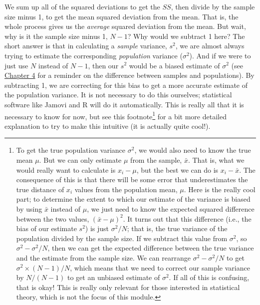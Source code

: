 \documentclass[
]{scrbook}
\begin{document}
We sum up all of the squared deviations to get the \(SS\), then divide by the sample size minus 1, to get the mean squared deviation from the mean.
That is, the whole process gives us the \emph{average} squared deviation from the mean.
But wait, why is it the sample size minus 1, \(N - 1\)?
Why would we subtract 1 here?
The short answer is that in calculating a \emph{sample} variance, \(s^{2}\), we are almost always trying to estimate the corresponding \emph{population} variance (\(\sigma^{2}\)).
And if we were to just use \(N\) instead of \(N - 1\), then our \(s^{2}\) would be a biased estimate of \(\sigma^{2}\) (see \protect\hyperlink{Chapter_4}{Chapter 4} for a reminder on the difference between samples and populations).
By subtracting 1, we are correcting for this bias to get a more accurate estimate of the population variance.
It is not necessary to do this ourselves; statistical software like Jamovi and R will do it automatically.
This is really all that it is necessary to know for now, but see this footnote\footnote{To get the true population variance \(\sigma^{2}\), we would also need to know the true mean \(\mu\). But we can only estimate \(\mu\) from the sample, \(\bar{x}\). That is, what we would really want to calculate is \(x_{i} - \mu\), but the best we can do is \(x_{i} - \bar{x}\). The consequence of this is that there will be some error that underestimates the true distance of \(x_{i}\) values from the population mean, \(\mu\). Here is the really cool part; to determine the extent to which our estimate of the variance is biased by using \(\bar{x}\) instead of \(\mu\), we just need to know the expected squared difference between the two values, \((\bar{x} - \mu)^{2}\). It turns out that this difference (i.e., the bias of our estimate \(s^{2}\)) is just \(\sigma^{2} / N\); that is, the true variance of the population divided by the sample size. If we subtract this value from \(\sigma^{2}\), so \(\sigma^{2} - \sigma^{2}/N\), then we can get the expected difference between the true variance and the estimate from the sample size. We can rearrange \(\sigma^{2} - \sigma^{2}/N\) to get \(\sigma^{2} \times (N - 1)/N\), which means that we need to correct our sample variance by \(N / (N-1)\) to get an unbiased estimate of \(\sigma^{2}\). If all of this is confusing, that is okay! This is really only relevant for those interested in statistical theory, which is not the focus of this module.} for a bit more detailed explanation to try to make this intuitive (it is actually quite cool!).
\end{document}
